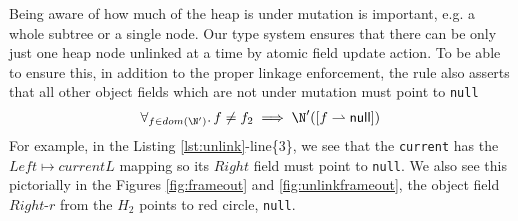 Being aware of how much of the heap is under mutation is important, e.g. a whole subtree or a single node. Our type system ensures that there can be only just one heap node unlinked at a time by atomic field update action. To be able to ensure this, in addition to the proper linkage enforcement, the rule also asserts that all other object fields which are not under mutation must point to \texttt{null}
\[\forall_{f\in dom(\N')} \ldotp f\neq f_2 \implies \N'([f\rightharpoonup \textsf{null}])\]
For example, in the Listing \ref{lst:unlink}-line\{3\}, we see that the \texttt{current} has the $Left \mapsto currentL$ mapping so its $Right$ field must point to \texttt{null}. We also see this pictorially in the Figures \ref{fig:frameout} and \ref{fig:unlinkframeout}, the object field $Right$-$r$ from the $H_2$ points to red circle, \texttt{null}.

